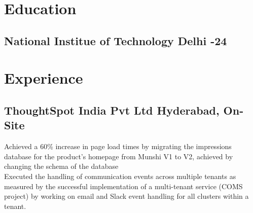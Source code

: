 \documentclass[]{Nikhil_Kadiyan_Resume}
\begin{document}

\descript{}

\section{Education}
\hrulefill

\subsection{National Institue of Technology Delhi \hfill {}-24}

\sectionsep



\section{Experience} 
\hrulefill

\subsection{ThoughtSpot India Pvt Ltd \hfill \normalfont Hyderabad, On-Site}

\pt Achieved a 60\% increase in page load times by migrating the impressions database for the product's homepage from Munshi V1 to V2, achieved by changing the schema of the database\\
\pt Executed the handling of communication events across multiple tenants as measured by the successful implementation of a multi-tenant service (COMS project) by working on email and Slack event handling for all clusters within a tenant. \\
\sectionsep
\end{document}
